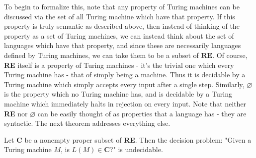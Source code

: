 \par To begin to formalize this, note that any property of Turing machines can be discussed via the set of all Turing machine which have that property. If this property is truly semantic as described above, then instead of thinking of the property as a set of Turing machines, we can instead think about the set of languages which have that property, and since these are necessarily languages defined by Turing machines, we can take them to be a subset of $\textbf{RE}$. Of course, \textbf{RE} itself is a property of Turing machines - it's the trivial one which every Turing machine has - that of simply being a machine. Thus it is decidable by a Turing machine which simply accepts every input after a single step. Similarly, $\varnothing$ is the property which no Turing machine has, and is decidable by a Turing machine which immediately halts in rejection on every input. Note that neither \textbf{RE} nor $\varnothing$ can be easily thought of as properties that a language has - they are syntactic. The next theorem addresses everything else.
\begin{theorem}
    Let \textbf{C} be a nonempty proper subset of \textbf{RE}. Then the decision problem: "Given a Turing machine $M$, is $L(M) \in \textbf{C}$?" is undecidable.
\end{theorem}
